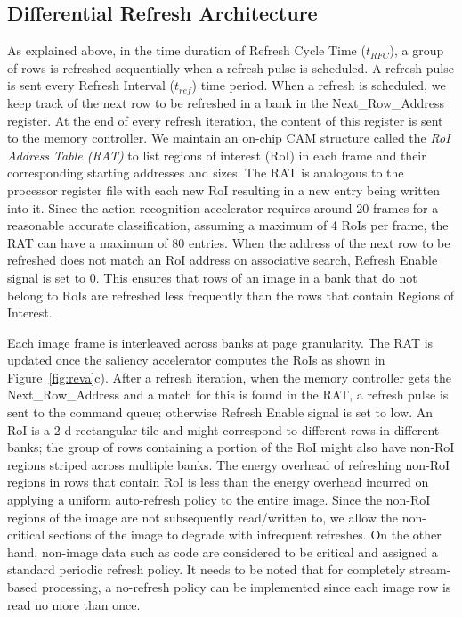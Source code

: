 \subsection{Differential Refresh Architecture}
As explained above, in the time duration of Refresh Cycle Time ($t_{RFC}$), a group of rows is refreshed sequentially when a refresh pulse is scheduled. A refresh pulse is sent every Refresh Interval ($t_{ref}$) time period.  When a refresh is scheduled, we keep track of the next row to be refreshed in a bank in the Next\_Row\_Address register. At the end of every refresh iteration, the content of this register is sent to the memory controller. 
We maintain an on-chip CAM structure called the \emph{RoI Address Table (RAT)} to list regions of interest (RoI) in each frame and their corresponding starting addresses and sizes. The RAT is analogous to the processor register file with each new RoI resulting in a new entry being written into it. Since the action recognition accelerator requires around 20 frames for a reasonable accurate classification, assuming a maximum of 4 RoIs per frame, the RAT can have a maximum of 80 entries. When the address of the next row to be refreshed does not match an RoI address on associative search, Refresh Enable signal is set to 0. This ensures that rows of an image in a bank that do not belong to RoIs are refreshed less frequently than the rows that contain Regions of Interest. 

Each image frame is interleaved across banks at page granularity. The RAT is updated once the saliency accelerator computes the RoIs as shown in Figure~\ref{fig:reva}c). After a refresh iteration, when the memory controller gets the Next\_Row\_Address and a match for this is found in the RAT, a refresh pulse is sent to the command queue; otherwise Refresh Enable signal is set to low. An RoI is a 2-d rectangular tile and might correspond to different rows in different banks; the group of rows containing a portion of the RoI might also have non-RoI regions striped across multiple banks. The energy overhead of refreshing non-RoI regions in rows that contain RoI is less than the energy overhead incurred on applying a uniform auto-refresh policy to the entire image. Since the non-RoI regions of the image are not subsequently read/written to, we allow the non-critical sections of the image to degrade with infrequent refreshes. On the other hand, non-image data such as code are considered to be critical and assigned a standard periodic refresh policy. It needs to be noted that for completely stream-based processing, a no-refresh policy can be implemented since each image row is read no more than once.
 
